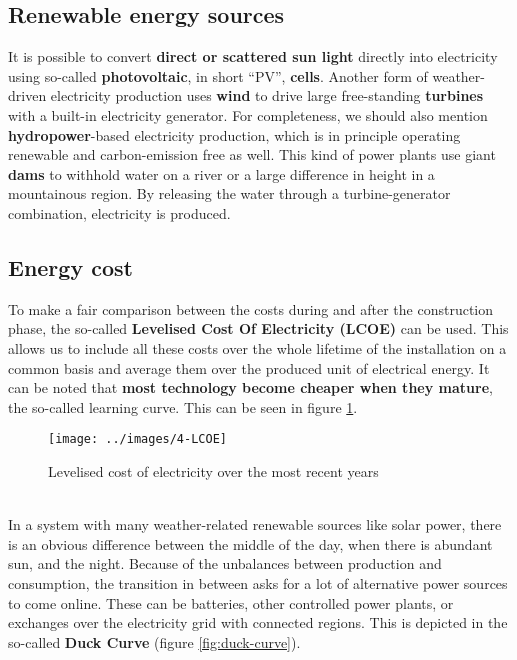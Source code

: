 \documentclass[../summary.tex]{subfiles}
\begin{document}
\subsection{Renewable energy sources}

It is possible to convert \textbf{direct or scattered sun light} directly into electricity using so-called \textbf{photovoltaic}, in short “PV”, \textbf{cells}. Another form of weather-driven electricity production uses \textbf{wind} to drive large free-standing \textbf{turbines} with a built-in electricity generator. For completeness, we should also mention \textbf{hydropower}-based electricity production, which is in principle operating renewable and carbon-emission free as well. This kind of power plants use giant \textbf{dams} to withhold water on a river or a large difference in height in a mountainous region. By releasing the water through a turbine-generator combination, electricity is produced.

\subsection{Energy cost}

To make a fair comparison between the costs during and after the construction phase, the so-called \textbf{Levelised Cost Of Electricity (LCOE)} can be used. This allows us to include all these costs over the whole lifetime of the installation on a common basis and average them over the produced unit of electrical energy. It can be noted that \textbf{most technology become cheaper when they mature}, the so-called learning curve. This can be seen in figure \ref{fig:lcoe}.

\begin{figure}[H]
	\centering
	\texttt{[image: ../images/4-LCOE]}
	\caption{Levelised cost of electricity over the most recent years}
	\label{fig:lcoe}
\end{figure}

\ \\
In a system with many weather-related renewable sources like solar power, there is an obvious difference between the middle of the day, when there is abundant sun, and the night. Because of the unbalances between production and consumption, the transition in between asks for a lot of alternative power sources to come online. These can be batteries, other controlled power plants, or exchanges over the electricity grid with connected regions. This is depicted in the so-called \textbf{Duck Curve} (figure \ref{fig:duck-curve}).
\end{document}
